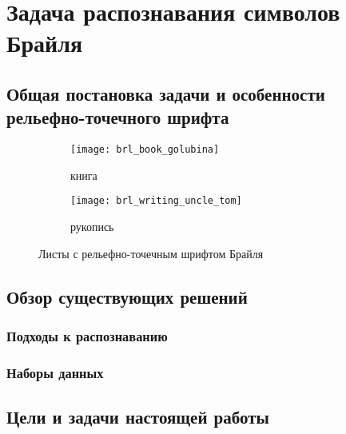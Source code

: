 \documentclass{main.tex}[subfiles]
\begin{document}
\section{Задача распознавания символов Брайля}
\subsection{Общая постановка задачи и особенности рельефно-точечного шрифта}
\begin{figure}[H]
    \centering
    \begin{subfigure}{.5\textwidth}
        \centering
        \texttt{[image: brl\_book\_golubina]}
        \caption{книга}
    \end{subfigure}%
    \begin{subfigure}{.5\textwidth}
        \centering
        \texttt{[image: brl\_writing\_uncle\_tom]}
        \caption{рукопись}
    \end{subfigure}
    \caption{Листы с рельефно-точечным шрифтом Брайля}
    \label{fig:brl_example} %
\end{figure}
\subsection{Обзор существующих решений}
\subsubsection{Подходы к распознаванию}

\cite{baumgartner2020app}
\cite{li2020braunet}
\cite{ovodov2020}
\cite{ovodov2021}
\cite{alsalman2021}
\cite{ortoncelli2021}

\subsubsection{Наборы данных}

\subsection{Цели и задачи настоящей работы}
\end{document}
